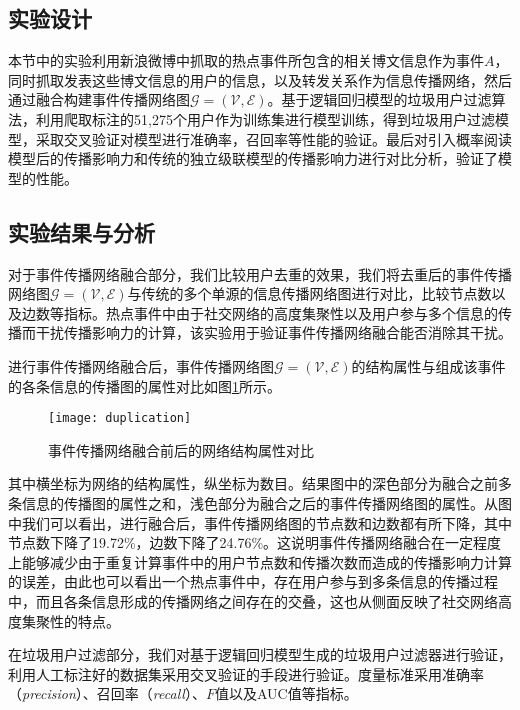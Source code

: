 \subsection{实验设计}
\label{subsec5:settings}
本节中的实验利用新浪微博中抓取的热点事件所包含的相关博文信息作为事件$A$，同时抓取发表这些博文信息的用户的信息，以及转发关系作为信息传播网络，然后通过融合构建事件传播网络图$\mathcal{G}=\left(\mathcal{V},\mathcal{E}\right)$。基于逻辑回归模型的垃圾用户过滤算法，利用爬取标注的51,275个用户作为训练集进行模型训练，得到垃圾用户过滤模型，采取交叉验证对模型进行准确率，召回率等性能的验证。最后对引入概率阅读模型后的传播影响力和传统的独立级联模型的传播影响力进行对比分析，验证了模型的性能。

\subsection{实验结果与分析}
\label{subsec5:resultAnalysis}
对于事件传播网络融合部分，我们比较用户去重的效果，我们将去重后的事件传播网络图$\mathcal{G}=\left(\mathcal{V},\mathcal{E}\right)$与传统的多个单源的信息传播网络图进行对比，比较节点数以及边数等指标。热点事件中由于社交网络的高度集聚性以及用户参与多个信息的传播而干扰传播影响力的计算，该实验用于验证事件传播网络融合能否消除其干扰。

进行事件传播网络融合后，事件传播网络图$\mathcal{G}=\left(\mathcal{V},\mathcal{E}\right)$的结构属性与组成该事件的各条信息的传播图的属性对比如图\ref{fig:duplication}所示。

\begin{figure}[!ht]
    \centering
    \texttt{[image: duplication]}
    \caption{事件传播网络融合前后的网络结构属性对比}
    \label{fig:duplication}
\end{figure}

其中横坐标为网络的结构属性，纵坐标为数目。结果图中的深色部分为融合之前多条信息的传播图的属性之和，浅色部分为融合之后的事件传播网络图的属性。从图中我们可以看出，进行融合后，事件传播网络图的节点数和边数都有所下降，其中节点数下降了19.72\%，边数下降了24.76\%。这说明事件传播网络融合在一定程度上能够减少由于重复计算事件中的用户节点数和传播次数而造成的传播影响力计算的误差，由此也可以看出一个热点事件中，存在用户参与到多条信息的传播过程中，而且各条信息形成的传播网络之间存在的交叠，这也从侧面反映了社交网络高度集聚性的特点。

在垃圾用户过滤部分，我们对基于逻辑回归模型生成的垃圾用户过滤器进行验证，利用人工标注好的数据集采用交叉验证的手段进行验证。度量标准采用准确率（\textit{precision}）、召回率（\textit{recall}）、$F$值以及AUC值等指标。

